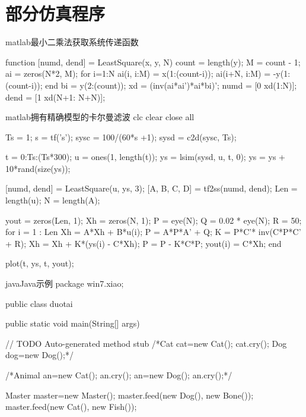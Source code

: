\chapter{部分仿真程序}\label{ch:fz}
\begin{mycode}{matlab}{最小二乘法获取系统传递函数}


function [numd, dend] = LeastSquare(x, y, N)
count = length(y);
M = count - 1;
ai = zeros(N*2, M);
for i=1:N
    ai(i, i:M) = x(1:(count-i));
    ai(i+N, i:M) = -y(1:(count-i));
end
bi = y(2:(count));
xd = (inv(ai*ai')*ai*bi)';
numd = [0 xd(1:N)];
dend = [1 xd(N+1: N+N)];
\end{mycode}
\begin{mycode}{matlab}{拥有精确模型的卡尔曼滤波}
clc
clear
close all

Ts = 1;               %
s = tf('s');
sysc = 100/(60*s +1);   %
sysd = c2d(sysc, Ts);

t = 0:Ts:(Ts*300);
u = ones(1, length(t));   %
ys = lsim(sysd, u, t, 0); %
ys = ys + 10*rand(size(ys)); %

[numd, dend] = LeastSquare(u, ys, 3);   %
[A, B, C, D] = tf2ss(numd, dend);       %
Len = length(u);
N = length(A);        %

yout = zeros(Len, 1);  %
Xh = zeros(N, 1);      %
P = eye(N);
Q = 0.02 * eye(N);     %
R = 50;                %
for i = 1 : Len
    Xh = A*Xh + B*u(i);
    P = A*P*A' + Q;
    K = P*C'* inv(C*P*C' + R);
    Xh = Xh + K*(ys(i) - C*Xh);
    P = P - K*C*P;
    yout(i) = C*Xh;
end

plot(t, ys, t, yout);
\end{mycode}
\begin{mycode}{java}{Java示例}
package win7.xiao;
	
public class duotai {
		
  public static void main(String[] args) {
    // TODO Auto-generated method stub
    /*Cat cat=new Cat();
      cat.cry();
      Dog dog=new Dog();*/
			
    /*Animal an=new Cat();
      an.cry();
      an=new Dog();
      an.cry();*/
			
    Master master=new Master();
    master.feed(new Dog(), new Bone());
    master.feed(new Cat(), new Fish());
      }
		
  }
\end{mycode}